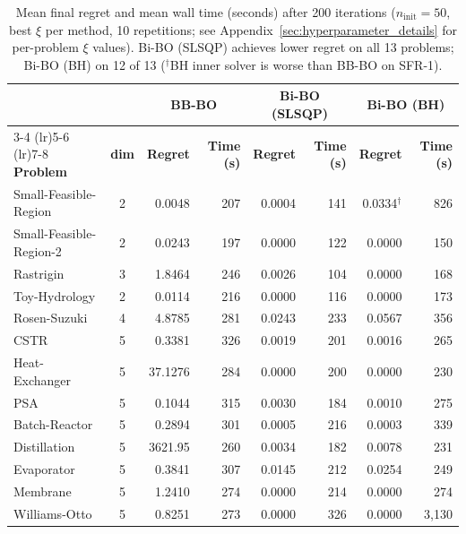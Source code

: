 \documentclass[12pt,a4paper]{article}%
\theoremstyle{plain}%
\theoremstyle{remark}%
\theoremstyle{definition}%
\begin{document}
\begin{table}[htbp]
\centering
\small
\caption{Mean final regret and mean wall time (seconds) after 200 iterations ($n_\text{init}=50$, best $\xi$ per method, 10 repetitions; see Appendix~\ref{sec:hyperparameter_details} for per-problem $\xi$ values). Bi-BO (SLSQP) achieves lower regret on all 13 problems; Bi-BO (BH) on 12 of 13 ($^\dagger$BH inner solver is worse than BB-BO on SFR-1).}
\label{tab:final_regret}
\begin{tabular}{@{}lc rr rr rr@{}}
\toprule
 & & \multicolumn{2}{c}{\textbf{BB-BO}} & \multicolumn{2}{c}{\textbf{Bi-BO (SLSQP)}} & \multicolumn{2}{c}{\textbf{Bi-BO (BH)}} \\
\cmidrule(lr){3-4} \cmidrule(lr){5-6} \cmidrule(lr){7-8}
\textbf{Problem} & \textbf{dim} & \textbf{Regret} & \textbf{Time (s)} & \textbf{Regret} & \textbf{Time (s)} & \textbf{Regret} & \textbf{Time (s)} \\
\midrule
Small-Feasible-Region   & 2 & 0.0048  & 207  & 0.0004 & 141 & 0.0334$^\dagger$ & 826   \\
Small-Feasible-Region-2 & 2 & 0.0243  & 197  & 0.0000 & 122 & 0.0000           & 150   \\
Rastrigin               & 3 & 1.8464  & 246  & 0.0026 & 104 & 0.0000           & 168   \\
Toy-Hydrology           & 2 & 0.0114  & 216  & 0.0000 & 116 & 0.0000           & 173   \\
Rosen-Suzuki            & 4 & 4.8785  & 281  & 0.0243 & 233 & 0.0567           & 356   \\
\midrule
CSTR                    & 5 & 0.3381  & 326  & 0.0019 & 201 & 0.0016           & 265   \\
Heat-Exchanger          & 5 & 37.1276 & 284  & 0.0000 & 200 & 0.0000           & 230   \\
PSA                     & 5 & 0.1044  & 315  & 0.0030 & 184 & 0.0010           & 275   \\
Batch-Reactor           & 5 & 0.2894  & 301  & 0.0005 & 216 & 0.0003           & 339   \\
Distillation            & 5 & 3621.95 & 260  & 0.0034 & 182 & 0.0078           & 231   \\
Evaporator              & 5 & 0.3841  & 307  & 0.0145 & 212 & 0.0254           & 249   \\
Membrane                & 5 & 1.2410  & 274  & 0.0000 & 214 & 0.0000           & 274   \\
Williams-Otto           & 5 & 0.8251  & 273  & 0.0000 & 326 & 0.0000           & 3{,}130 \\
\bottomrule
\end{tabular}
\end{table}
\end{document}
